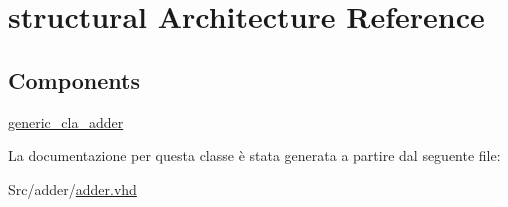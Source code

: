 \hypertarget{classadder_1_1structural}{\section{structural Architecture Reference}
\label{classadder_1_1structural}
}
\subsection*{Components}
 \begin{DoxyCompactItemize}
\item 
\hyperlink{group___adder_gae7148956d4ef1d1cd14f35060634b9c3}{generic\+\_\+cla\+\_\+adder}  {\bfseries }  
\end{DoxyCompactItemize}


La documentazione per questa classe è stata generata a partire dal seguente file\+:\begin{DoxyCompactItemize}
\item 
Src/adder/\hyperlink{adder_8vhd}{adder.\+vhd}\end{DoxyCompactItemize}
